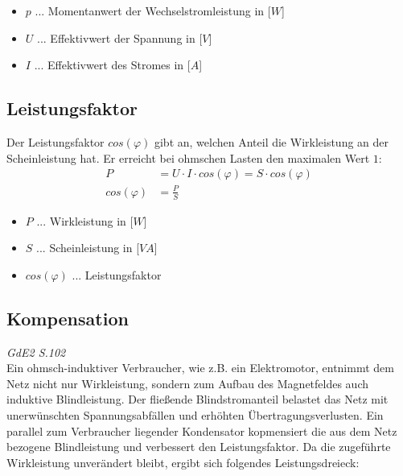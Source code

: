 \begin{itemize}
    \item $p$ ... Momentanwert der Wechselstromleistung in [$W$]
    \item $U$ ... Effektivwert der Spannung in [$V$]
    \item $I$ ... Effektivwert des Stromes in [$A$]
\end{itemize}

\subsection{Leistungsfaktor}
Der Leistungsfaktor $cos(\varphi)$ gibt an, welchen Anteil die Wirkleistung an der Scheinleistung hat. Er erreicht bei ohmschen Lasten den maximalen Wert $1$:
\begin{align}
    P &= U \cdot I \cdot cos(\varphi) = S \cdot cos(\varphi) \\
    cos(\varphi) &= \frac{P}{S} 
\end{align}
\begin{itemize}
    \item $P$ ... Wirkleistung in [$W$]
    \item $S$ ... Scheinleistung in [$VA$]
    \item $cos(\varphi)$ ... Leistungsfaktor
\end{itemize}

\subsection{Kompensation}
\textit{GdE2 S.102} \\
Ein ohmsch-induktiver Verbraucher, wie z.B. ein Elektromotor, entnimmt dem Netz nicht nur Wirkleistung, sondern zum Aufbau des Magnetfeldes auch induktive Blindleistung. Der fließende Blindstromanteil belastet das Netz mit unerwünschten Spannungsabfällen und erhöhten Übertragungsverlusten. Ein parallel zum Verbraucher liegender Kondensator kopmensiert die aus dem Netz bezogene Blindleistung und verbessert den Leistungsfaktor. Da die zugeführte Wirkleistung unverändert bleibt, ergibt sich folgendes Leistungsdreieck:

